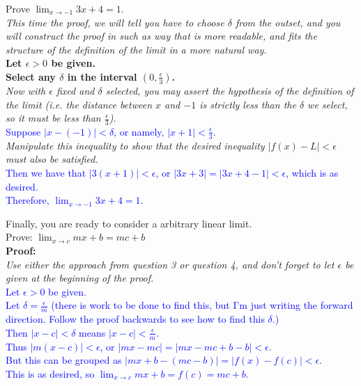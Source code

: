 \documentclass{ximera}
\begin{document}
\begin{exercise}
    Prove $\lim_{x\rightarrow-1}3x+4=1$.\\
    \textit{This time the proof, we will tell you have to choose $\delta$ from the outset, and you will construct the proof in such as way that is more readable, and fits the structure of the definition of the limit in a more natural way.}\\
    \textbf{Let $\epsilon>0$ be given.}\\
    \textbf{Select any $\delta$ in the interval $(0,\frac{\epsilon}{3})$.}\\
    \textit{Now with $\epsilon$ fixed and $\delta$ selected, you may assert the hypothesis of the definition of the limit (i.e. the distance between $x$ and $-1$ is strictly less than the $\delta$ we select, so it must be less than $\frac{\epsilon}{3}$).}\\
    \textcolor{blue}{Suppose $|x-(-1)|<\delta$, or namely, $|x+1|<\frac{\epsilon}{3}$.}\\
    \textit{Manipulate this inequality to show that the desired inequality $|f(x)-L|<\epsilon$ must also be satisfied.}\\
    \textcolor{blue}{Then we have that $|3(x+1)|<\epsilon$, or $|3x+3|=|3x+4-1|<\epsilon$, which is as desired.\\
    Therefore, $\lim_{x\rightarrow -1}3x+4=1$.}
\end{exercise}

\begin{exercise}
    Finally, you are ready to consider a arbitrary linear limit.\\
    Prove: $\lim_{x\rightarrow c}mx+b=mc+b$\\
    \textbf{Proof:}\\
    \textit{Use either the approach from question 3 or question 4, and don't forget to let $\epsilon$ be given at the beginning of the proof.}\\
    \textcolor{blue}{Let $\epsilon>0$ be given.\\
    Let $\delta=\frac{\epsilon}{m}$ (there is work to be done to find this, but I'm just writing the forward direction.  Follow the proof backwards to see how to find this $\delta$.)\\
    Then $|x-c|<\delta$ means $|x-c|<\frac{\epsilon}{m}$. \\
    Thus $|m(x-c)|<\epsilon$, or $|mx-mc|=|mx-mc+b-b|<\epsilon$.\\
    But this can be grouped as $|mx+b-(mc-b)|=|f(x)-f(c)|<\epsilon$.\\
    This is as desired, so $\lim_{x\rightarrow c}mx+b=f(c)=mc+b$.}
\end{exercise}
\end{document}
